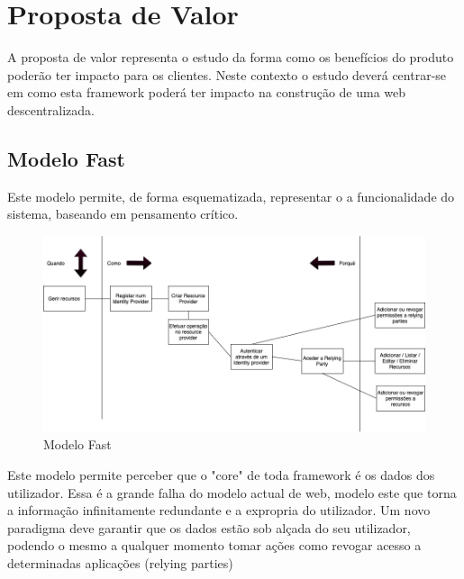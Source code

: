\section{Proposta de Valor}
A proposta de valor representa o estudo da forma como os benefícios do produto poderão ter impacto para os clientes. Neste contexto o estudo deverá centrar-se em como esta framework poderá ter impacto na construção de uma web descentralizada.

\subsection{Modelo Fast}
Este modelo permite, de forma esquematizada, representar o a funcionalidade do sistema, baseando em pensamento crítico.

\begin{figure}[h]
    \begin{center}
    \includegraphics[width=1\textwidth]{figures/Canvas-FAST.png}
    \caption{Modelo Fast}
    \end{center}
\end{figure}

Este modelo permite perceber que o "core" de toda framework é os dados dos utilizador. Essa é a grande falha do modelo actual de web, modelo este que torna a informação infinitamente redundante e a expropria do utilizador.
Um novo paradigma deve garantir que os dados estão sob alçada do seu utilizador, podendo o mesmo a qualquer momento tomar ações como revogar acesso a determinadas aplicações (relying parties)

